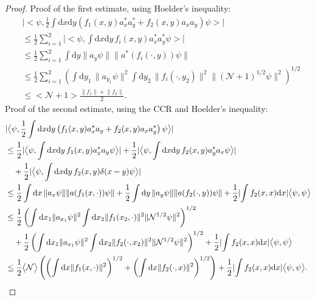 \documentclass[11pt,a4paper]{scrartcl}
\newcommand{\di}{\textrm{d}}		%
\newcommand{\Ncal}{\mathcal{N}}		%
\newcommand{\scal}[2]{\big<#1,#2\big>} %
\newcommand{\norm}[1]{\lVert#1\rVert}	%
\newcommand{\ev}[1]{\big<#1\big>}	%
\begin{document}
\begin{proof} Proof of the first estimate, using Hoelder's inequality:
 \begin{align*}
  & \lvert \scal{\psi}{\frac{1}{2} \int \di x\di y \left( f_1(x,y) a^\ast_x a^\ast_y + f_2(x,y) a_x a_y \right) \psi} \rvert \\
& \leq \frac{1}{2} \sum_{i=1}^2 \lvert \scal{\psi}{\int \di x\di y\, f_i(x,y) a^\ast_x a^\ast_y \psi }\rvert \\
& \leq \frac{1}{2} \sum_{i=1}^2 \int \di y \norm{a_y \psi} \norm{a^\ast(f_i(\cdot,y))\psi} \\
& \leq \frac{1}{2} \sum_{i=1}^2 \left( \int \di y_1\, \norm{a_{y_1}\psi}^2 \int \di y_2\, \norm{f_i(\cdot,y_2)}^2 \norm{(\Ncal+1)^{1/2} \psi}^2 \right)^{1/2} \\
& \leq \ev{\Ncal+1} \frac{\norm{f_1}+\norm{f_2}}{2}.
 \end{align*}
Proof of the second estimate, using the CCR and Hoelder's inequality:
 \begin{align*}
& \lvert \scal{\psi}{\frac{1}{2} \int \di x\di y \left( f_1(x,y) a^\ast_x a_y + f_2(x,y) a_x a^\ast_y \right)  \psi} \rvert\\
& \leq \frac{1}{2} \lvert \scal{\psi}{\int \di x\di y\, f_1(x,y) a^\ast_x a_y \psi} \rvert + \frac{1}{2}\lvert \scal{\psi}{\int \di x \di y\, f_2(x,y) a^\ast_y a_x \psi}\rvert \\
&\quad + \frac{1}{2} \lvert \scal{\psi}{\int \di x \di y\, f_2(x,y) \delta(x-y) \psi}\rvert \\
& \leq \frac{1}{2} \int \di x\, \norm{a_x \psi} \norm{a(f_1(x,\cdot))\psi} + \frac{1}{2} \int \di y\, \norm{a_y\psi} \norm{a(f_2(\cdot,y))\psi} + \frac{1}{2} \lvert \int f_2(x,x) \di x \rvert \scal{\psi}{\psi} \\
& \leq \frac{1}{2} \left( \int \di x_1 \norm{a_{x_1}\psi}^2 \int \di x_2 \norm{f_1(x_2,\cdot)}^2 \norm{\Ncal^{1/2}\psi}^2 \right)^{1/2}\\
& \quad + \frac{1}{2} \left( \int \di x_1 \norm{a_{x_1}\psi}^2 \int \di x_2 \norm{f_2(\cdot,x_2)}^2 \norm{\Ncal^{1/2}\psi}^2 \right)^{1/2} + \frac{1}{2}\lvert \int f_2(x,x) \di x\rvert \scal{\psi}{\psi} \\
& \leq \frac{1}{2}\ev{\Ncal} \left(\left(\int \di x \norm{f_1(x,\cdot)}^2 \right)^{1/2} + \left(\int \di x \norm{f_2(\cdot,x)}^2 \right)^{1/2} \right) + \frac{1}{2}\lvert \int f_2(x,x) \di x\rvert \scal{\psi}{\psi}. 	\qedhere
 \end{align*}
\end{proof}
\end{document}
